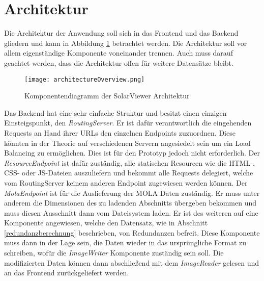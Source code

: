 \section{Architektur}
Die Architektur der Anwendung soll sich in das Frontend und das Backend gliedern und kann in Abbildung \ref{architectureOverview} betrachtet werden. Die Architektur soll vor allem eigenständige Komponente voneinander trennen. Auch muss darauf geachtet werden, dass die Architektur offen für weitere Datensätze bleibt.

\begin{figure}[H]
  \texttt{[image: architectureOverview.png]}
  \caption{Komponentendiagramm der SolarViewer Architektur}
  \label{architectureOverview}
\end{figure}

Das Backend hat eine sehr einfache Struktur und besitzt einen einzigen Einsteigspunkt, den \textit{RoutingServer}. Er ist dafür verantwortlich die eingehenden Requests an Hand ihrer URLs den einzelnen Endpoints zuzuordnen. Diese könnten in der Theorie auf verschiedenen Servern angesiedelt sein um ein Load Balancing zu ermöglichen. Dies ist für den Prototyp jedoch nicht erforderlich. Der \textit{ResourceEndpoint} ist dafür zuständig, alle statischen Resourcen wie die HTML-, CSS- oder JS-Dateien auszuliefern und bekommt alle Requests delegiert, welche vom RoutingServer keinem anderen Endpoint zugewiesen werden können. Der \textit{MolaEndpoint} ist für die Auslieferung der MOLA Daten zuständig. Er muss unter anderem die Dimensionen des zu ladenden Abschnitts übergeben bekommen und muss diesen Ausschnitt dann vom Dateisystem laden. Er ist des weiteren auf eine Komponente angewiesen, welche den Datensatz, wie in Abschnitt \ref{redundanzberechnung} beschrieben, von Redundanzen befreit. Diese Komponente muss dann in der Lage sein, die Daten wieder in das ursprüngliche Format zu schreiben, wofür die \textit{ImageWriter} Komponente zuständig sein soll. Die modifizierten Daten können dann abschließend mit dem \textit{ImageReader} gelesen und an das Frontend zurückgeliefert werden.

